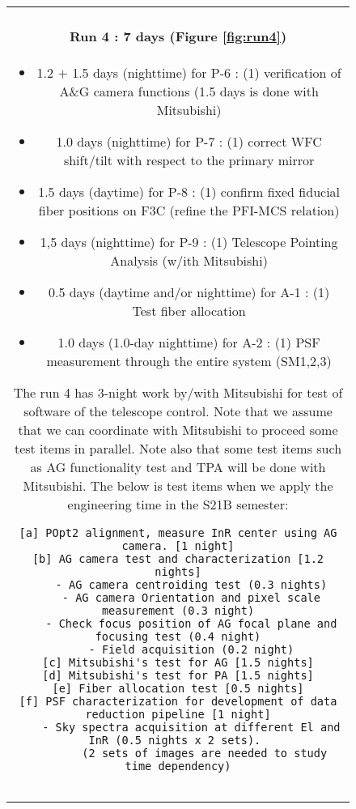 \begin{figure}[!ht]
\begin{center}
\begin{tabular}{c}
\begin{minipage}{0.95\hsize}
\paragraph{Run 4 : 7 days  (Figure \ref{fig:run4})}
	\begin{itemize}
	\item 1.2 $+$ 1.5 days (nighttime) for P-6 :
	(1) verification of A\&G camera functions (1.5 days is done with Mitsubishi)
	\item 1.0 days (nighttime) for P-7 :
	(1) correct WFC shift/tilt with respect to the primary mirror
	\item 1.5 days (daytime) for P-8 :  
	(1) confirm fixed fiducial fiber positions on F3C (refine the PFI-MCS relation)
	\item 1,5 days (nighttime) for P-9 :
	(1) Telescope Pointing Analysis (w/ith Mitsubishi)
	\item 0.5 days (daytime and/or nighttime) for A-1 : 
	(1) Test fiber allocation
	\item 1.0 days (1.0-day nighttime) for A-2 : 
	(1) PSF measurement through the entire system (SM1,2,3)	
\end{itemize}
The run 4 has 3-night work by/with Mitsubishi for test of software of the telescope control.
Note that we assume that we can coordinate with Mitsubishi to proceed some test items in parallel.
Note also that some test items such as AG functionality test and TPA will be done with Mitsubishi. 
The below is test items when we apply the engineering time in the S21B semester:
\begin{verbatim}
[a] POpt2 alignment, measure InR center using AG camera. [1 night]
[b] AG camera test and characterization [1.2 nights]
    - AG camera centroiding test (0.3 nights)
    - AG camera Orientation and pixel scale measurement (0.3 night)
    - Check focus position of AG focal plane and focusing test (0.4 night)
    - Field acquisition (0.2 night)
[c] Mitsubishi's test for AG [1.5 nights]
[d] Mitsubishi's test for PA [1.5 nights]
[e] Fiber allocation test [0.5 nights]
[f] PSF characterization for development of data reduction pipeline [1 night]
    - Sky spectra acquisition at different El and InR (0.5 nights x 2 sets). 
        (2 sets of images are needed to study time dependency)


\end{verbatim}
\end{minipage}
\end{tabular}
\end{center}
\end{figure}
